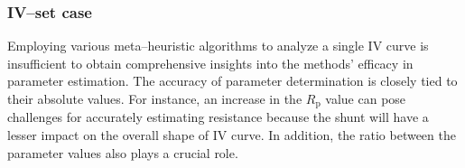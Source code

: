 \documentclass[a4paper,fleqn]{cas-sc}
\begin{document}

\subsubsection{IV--set case}\label{SetIV}
Employing various meta--heuristic algorithms to analyze a single IV curve
is insufficient to obtain comprehensive insights into the methods' efficacy in parameter estimation.
The accuracy of parameter determination is closely tied to their absolute values.
For instance, an increase in the $R_\mathrm{p}$ value can pose challenges for accurately estimating resistance
because the shunt will have a lesser impact on the overall shape of IV curve.
In addition, the ratio between the parameter values also plays a crucial role.
\end{document}
